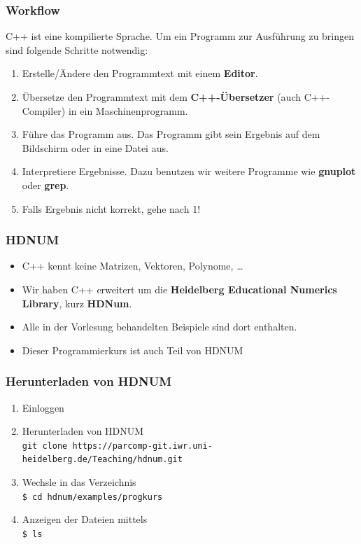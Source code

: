 \documentclass[ignorenonframetext,12pt]{beamer}
\theoremstyle{definition}
\theoremstyle{definition}
\begin{document}
\begin{frame}[fragile]
\frametitle{Workflow}
C++ ist eine \glqq{}kompilierte\grqq{} Sprache. Um ein Programm zur
Ausführung zu bringen sind folgende Schritte notwendig:
\begin{enumerate}
\item Erstelle/Ändere den Programmtext mit einem \textbf{Editor}.
\item Übersetze den Programmtext mit dem \textbf{C++-Übersetzer}
  (auch C++-Compiler) in ein Maschinenprogramm.
\item Führe das Programm aus. Das Programm gibt sein Ergebnis auf dem
  Bildschirm oder in eine Datei aus.
\item Interpretiere Ergebnisse. Dazu benutzen wir weitere Programme
  wie \textbf{gnuplot} oder \textbf{grep}.
\item Falls Ergebnis nicht korrekt, gehe nach 1!
\end{enumerate}
\end{frame}

\begin{frame}[fragile]
\frametitle{HDNUM}
\begin{itemize}
\item C++ kennt keine Matrizen, Vektoren, Polynome, \ldots
\item Wir haben C++ erweitert um die \textbf{Heidelberg Educational
  Numerics Library}, kurz \textbf{HDNum}.
\item Alle in der Vorlesung behandelten Beispiele sind dort
  enthalten.
\item Dieser Programmierkurs ist auch Teil von HDNUM
\end{itemize}
\end{frame}

\begin{frame}
\frametitle{Herunterladen von HDNUM }
\begin{enumerate}
\item Einloggen
\item Herunterladen von HDNUM\\
\texttt{\tiny git clone https://parcomp-git.iwr.uni-heidelberg.de/Teaching/hdnum.git}
\item Wechsle in das Verzeichnis \\ \lstinline{$ cd hdnum/examples/progkurs} %
\item Anzeigen der Dateien mittels\\ \lstinline{$ ls} %
\end{enumerate}
\end{frame}
\end{document}

